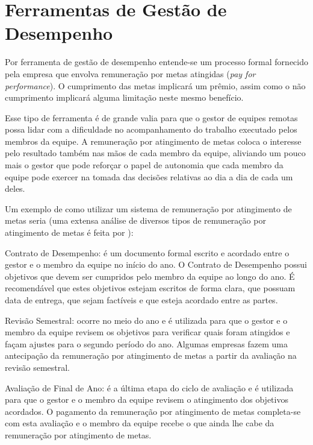 \documentclass[12pt]{article} %
\begin{document}
\section{\fontsize{12}{12}\textbf{Ferramentas de Gestão de Desempenho}}

Por ferramenta de gestão de desempenho entende-se um processo formal fornecido pela empresa que envolva 
remuneração por metas atingidas (\textit{pay for performance}). 
O cumprimento das metas implicará um prêmio, assim como 
o não cumprimento implicará  alguma limitação neste mesmo benefício. 

Esse tipo de ferramenta é 
de grande valia para que o gestor de equipes remotas possa lidar com a dificuldade no acompanhamento do trabalho
executado pelos membros da equipe. A remuneração por atingimento de metas coloca o interesse pelo resultado também
nas mãos de cada membro da equipe, aliviando um pouco mais o gestor que pode reforçar o papel de autonomia que cada membro
da equipe pode exercer na tomada das decisões relativas ao dia a dia de cada um deles. 

Um exemplo de como utilizar um sistema de remuneração por atingimento de metas seria (uma extensa análise de
diversos tipos de remuneração por atingimento de metas é feita por \cite{sirota}):

\begin{description}

\item{Contrato de Desempenho:} é um documento formal escrito e acordado entre o gestor e o membro da equipe no início do ano.
                                                      O Contrato de Desempenho possui objetivos que devem ser cumpridos
                                                      pelo membro da equipe ao longo do ano. É recomendável que estes objetivos estejam escritos de
                                                      forma clara, que possuam data de entrega, que sejam factíveis e que esteja acordado entre 
                                                      as partes.

\item{Revisão Semestral:} ocorre no meio do ano e é utilizada para que o gestor e o membro da equipe revisem
                                         os objetivos para verificar quais foram atingidos e façam ajustes para o segundo período do ano.
                                         Algumas empresas fazem uma antecipação da remuneração por atingimento de metas
                                         a partir da avaliação na revisão semestral. 

\item{Avaliação de Final de Ano:} é a última etapa do ciclo de avaliação 
							       e é utilizada para que o gestor e o membro da equipe revisem o
                                                    atingimento dos objetivos acordados. O pagamento da remuneração por atingimento
                                                    de metas completa-se com esta avaliação e o membro da equipe recebe o que ainda lhe
                                                    cabe da remuneração por atingimento de metas.

\end{description}
\end{document}
